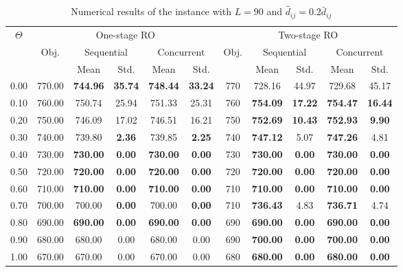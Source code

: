 \documentclass[preprint,review,10pt,round,authoryear]{elsarticle}\usepackage[]{graphicx}\usepackage[]{color}
\theoremstyle{plain}
\theoremstyle{definition}
\theoremstyle{remark}
\begin{document}
\begin{table*}[!ht]
\small
      \caption{Numerical results of the instance with $L=90$ and $\hat{d}_{ij}= 0.2\bar{d}_{ij} $}
      \begin{center}
      \begin{tabular}{||c| c| c| c| c| c| c| c| c|c|c||}
      \hline
      \hline
      \multirow{3}{*}{$\Theta$} &
      \multicolumn{5}{|c|}{One-stage RO} &
      \multicolumn{5}{|c||}{Two-stage RO} \\
      \cline{2-6}
      \cline{7-11}
      &\multirow{2}{*}{Obj.} &
      \multicolumn{2}{|c|}{Sequential} &
      \multicolumn{2}{|c|}{Concurrent} &
      \multirow{2}{*}{Obj.} &
      \multicolumn{2}{|c|}{Sequential} &
      \multicolumn{2}{|c||}{Concurrent}\\
      \cline{3-6}
      \cline{8-11}
      &&Mean&Std.&Mean&Std.&&Mean&Std.&Mean&Std.\\
      \hline%
  \hline
0.00 & 770.00 & \textbf{744.96} & \textbf{35.74} & \textbf{748.44} & \textbf{33.24} & 770 & 728.16 & 44.97 & 729.68 & 45.17 \\ 
   \hline
0.10 & 760.00 & 750.74 & 25.94 & 751.33 & 25.31 & 760 & \textbf{754.09} & \textbf{17.22} & \textbf{754.47} & \textbf{16.44} \\ 
   \hline
0.20 & 750.00 & 746.09 & 17.02 & 746.51 & 16.21 & 750 & \textbf{752.69} & \textbf{10.43} & \textbf{752.93} & \textbf{9.90} \\ 
   \hline
0.30 & 740.00 & 739.80 & \textbf{2.36} & 739.85 & \textbf{2.25} & 740 & \textbf{747.12} & 5.07 &\textbf{ 747.26} & 4.81 \\ 
   \hline
0.40 & 730.00 & \textbf{730.00} & \textbf{0.00} & \textbf{730.00} & \textbf{0.00} & 730 & \textbf{730.00} & \textbf{0.00} & \textbf{730.00} & \textbf{0.00} \\ 
   \hline
0.50 & 720.00 & \textbf{720.00} & \textbf{0.00} & \textbf{720.00} & \textbf{0.00} & 720 & \textbf{720.00} & \textbf{0.00} & \textbf{720.00} & \textbf{0.00} \\ 
   \hline
0.60 & 710.00 & \textbf{710.00} & \textbf{0.00 }& \textbf{710.00} & \textbf{0.00} & 710 & \textbf{710.00} & \textbf{0.00} & \textbf{710.00} & \textbf{0.00} \\ 
   \hline
0.70 & 700.00 & 700.00 & \textbf{0.00} & 700.00 & \textbf{0.00} & 710 & \textbf{736.43} & 4.83 & \textbf{736.71} & 4.74 \\ 
   \hline
0.80 & 690.00 &\textbf{ 690.00} & \textbf{0.00} & \textbf{690.00} & \textbf{0.00} & 690 & \textbf{690.00 }& \textbf{0.00} & \textbf{690.00} & \textbf{0.00} \\ 
   \hline
0.90 & 680.00 & 680.00 & 0.00 & 680.00 & 0.00 & 690 & \textbf{700.00} & \textbf{0.00} & \textbf{700.00} & \textbf{0.00} \\ 
   \hline
1.00 & 670.00 & 670.00 & 0.00 & 670.00 & 0.00 & 680 & \textbf{680.00} & \textbf{0.00} &\textbf{ 680.00} & \textbf{0.00} \\ 
  \hline
\hline
      \end{tabular}
      \end{center}
      \label{table:3}
      \end{table*}
\end{document}
